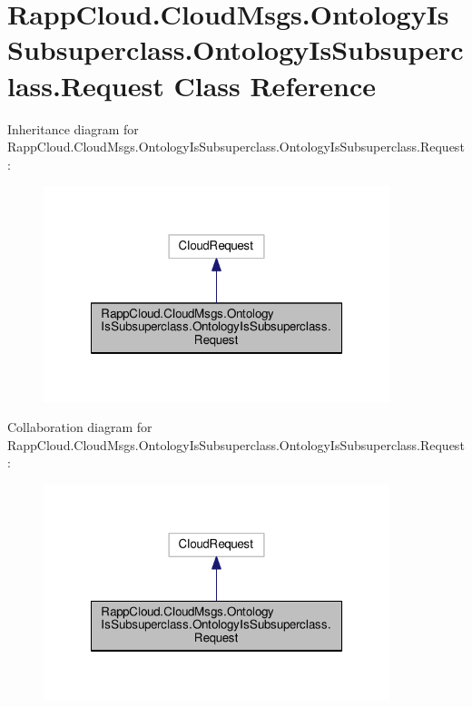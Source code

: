 \hypertarget{classRappCloud_1_1CloudMsgs_1_1OntologyIsSubsuperclass_1_1OntologyIsSubsuperclass_1_1Request}{\section{Rapp\-Cloud.\-Cloud\-Msgs.\-Ontology\-Is\-Subsuperclass.\-Ontology\-Is\-Subsuperclass.\-Request Class Reference}
\label{classRappCloud_1_1CloudMsgs_1_1OntologyIsSubsuperclass_1_1OntologyIsSubsuperclass_1_1Request}
}


Inheritance diagram for Rapp\-Cloud.\-Cloud\-Msgs.\-Ontology\-Is\-Subsuperclass.\-Ontology\-Is\-Subsuperclass.\-Request\-:
\nopagebreak
\begin{figure}[H]
\begin{center}
\leavevmode
\includegraphics[width=286pt]{classRappCloud_1_1CloudMsgs_1_1OntologyIsSubsuperclass_1_1OntologyIsSubsuperclass_1_1Request__inherit__graph}
\end{center}
\end{figure}


Collaboration diagram for Rapp\-Cloud.\-Cloud\-Msgs.\-Ontology\-Is\-Subsuperclass.\-Ontology\-Is\-Subsuperclass.\-Request\-:
\nopagebreak
\begin{figure}[H]
\begin{center}
\leavevmode
\includegraphics[width=286pt]{classRappCloud_1_1CloudMsgs_1_1OntologyIsSubsuperclass_1_1OntologyIsSubsuperclass_1_1Request__coll__graph}
\end{center}
\end{figure}
